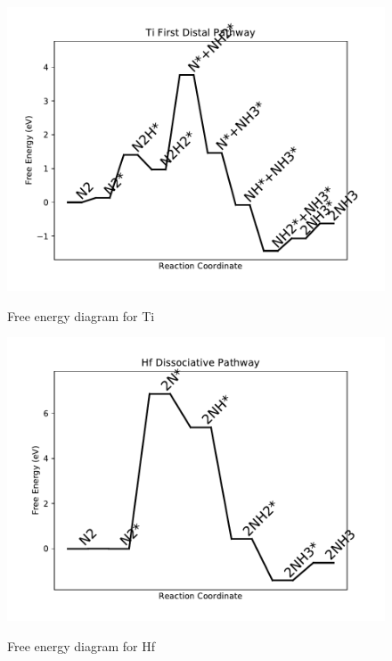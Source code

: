 \documentclass{article}
\begin{document}
\newpage
\begin{figure}
\includegraphics[width=1\linewidth]{data/plots/Ti_distal_1.pdf}
\label{fig:Ti_distal_1}
\caption{Free energy diagram for Ti}
\end{figure}

\begin{figure}
\includegraphics[width=1\linewidth]{data/plots/Hf_dissociative.pdf}
\label{fig:Hf_dissociative}
\caption{Free energy diagram for Hf}
\end{figure}
\end{document}
